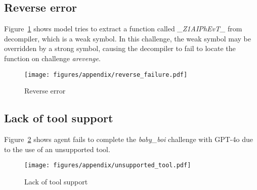 


\subsection{Reverse error}
Figure~\ref{fig:fail_reverse} shows model tries to extract a function called \textit{\_Z1AIPhEvT\_} from decompiler, which is a weak symbol. In this challenge, the weak symbol may be overridden by a strong symbol, causing the decompiler to fail to locate the function on challenge \textit{arevenge}.
\begin{figure}[H]
    \centering
    \texttt{[image: figures/appendix/reverse\_failure.pdf]}
    \caption{Reverse error}
    \label{fig:fail_reverse}
\end{figure}

\subsection{Lack of tool support}
Figure~\ref{fig:unsupported_tool} shows agent fails to complete the \textit{baby\_boi} challenge with GPT-4o due to the use of an unsupported tool.
\begin{figure}
    \centering
    \texttt{[image: figures/appendix/unsupported\_tool.pdf]}
    \caption{Lack of tool support}
    \label{fig:unsupported_tool}
\end{figure}

